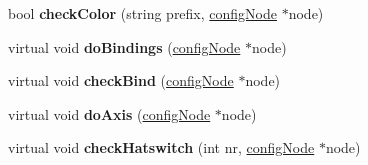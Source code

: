 \begin{DoxyCompactItemize}
\item 
bool {\bfseries check\+Color} (string prefix, \hyperlink{classconfigNode}{config\+Node} $\ast$node)\hypertarget{classVegaConfig_ac1522359d6e4646fb7d8ec5a59f152c2}{}\label{classVegaConfig_ac1522359d6e4646fb7d8ec5a59f152c2}

\item 
virtual void {\bfseries do\+Bindings} (\hyperlink{classconfigNode}{config\+Node} $\ast$node)\hypertarget{classVegaConfig_a3767c08c8e4d3ee76b3e8efdbecf72da}{}\label{classVegaConfig_a3767c08c8e4d3ee76b3e8efdbecf72da}

\item 
virtual void {\bfseries check\+Bind} (\hyperlink{classconfigNode}{config\+Node} $\ast$node)\hypertarget{classVegaConfig_ac8af87d480a0214246be3cd470ed3279}{}\label{classVegaConfig_ac8af87d480a0214246be3cd470ed3279}

\item 
virtual void {\bfseries do\+Axis} (\hyperlink{classconfigNode}{config\+Node} $\ast$node)\hypertarget{classVegaConfig_a118134a2a5c58876f3cd898184c13e56}{}\label{classVegaConfig_a118134a2a5c58876f3cd898184c13e56}

\item 
virtual void {\bfseries check\+Hatswitch} (int nr, \hyperlink{classconfigNode}{config\+Node} $\ast$node)\hypertarget{classVegaConfig_aaa57ad84c33e186fcc5a411fc3b5b501}{}\label{classVegaConfig_aaa57ad84c33e186fcc5a411fc3b5b501}

\end{DoxyCompactItemize}
